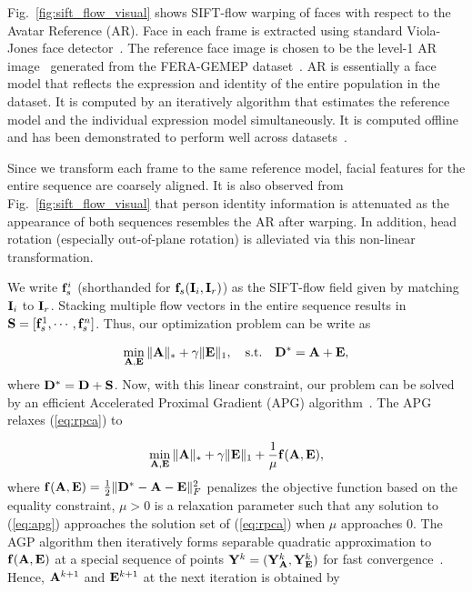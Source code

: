 \documentclass[journal]{IEEEtran}
\begin{document}
Fig.~\ref{fig:sift_flow_visual} shows SIFT-flow warping of faces with respect to the Avatar Reference (AR). Face in each frame is extracted using standard Viola-Jones face detector~\cite{Viola_IJCV04}. The reference face image is chosen to be the level-1 AR image~\cite{Yang_SMCB12} generated from the FERA-GEMEP dataset~\cite{Valstar_FERA11}. AR is essentially a face model that reflects the expression and identity of the entire population in the dataset. It is computed by an iteratively algorithm that estimates the reference model and the individual expression model simultaneously. It is computed offline and has been demonstrated to perform well across datasets~\cite{Yang_SMCB12}. 

Since we transform each frame to the same reference model, facial features for the entire sequence are coarsely aligned. It is also observed from Fig.~\ref{fig:sift_flow_visual} that person identity information is attenuated as the appearance of both sequences resembles the AR after warping. In addition, head rotation (especially out-of-plane rotation) is alleviated via this non-linear transformation. 

We write ${\bf f}_s^i$ (shorthanded for ${\bf f}_s({\bf I}_i,{\bf I}_r)$) as the SIFT-flow field given by matching ${\bf I}_i$ to ${\bf I}_r$. Stacking multiple flow vectors in the entire sequence results in ${\bf S} = [{\bf f}_s^1, \cdots,{\bf f}_s^n]$. Thus, our optimization problem can be write as

\begin{equation} \label{eq:rpca}
\min_{\A,\E} \|\A\|_*+\gamma \|\E\|_1,  \quad \text{s.t.} \quad \D^* = \A + \E, 
\end{equation}
where ${\bf D}^*={\bf D}+{\bf S}$. Now, with this linear constraint, our problem can be solved by an efficient Accelerated Proximal Gradient (APG) algorithm~\cite{Beck09}. The APG relaxes (\ref{eq:rpca}) to

\begin{equation} \label{eq:apg}
\min_{\A,\E} \|\A\|_* + \gamma \|\E\|_1 + \frac{1}{\mu}\f(\A,\E),
\end{equation}
\noindent where ${\bf f}({\bf A},{\bf E})=\frac{1}{2}\|{\bf D}^*-{\bf A}-{\bf E}\|^2_F$ penalizes the objective function based on the equality constraint, $\mu>0$ is a relaxation parameter such that any solution to (\ref{eq:apg}) approaches the solution set of (\ref{eq:rpca}) when $\mu$ approaches 0. The AGP algorithm then iteratively forms separable quadratic approximation to ${\bf f}({\bf A},{\bf E})$ at a special sequence of points ${\bf Y}^k=({\bf Y}^k_{\bf A},{\bf Y}^k_{\bf E})$ for fast convergence~\cite{Beck09}. Hence, ${\bf A}^{k+1}$ and ${\bf E}^{k+1}$ at the next iteration is obtained by
\end{document}
